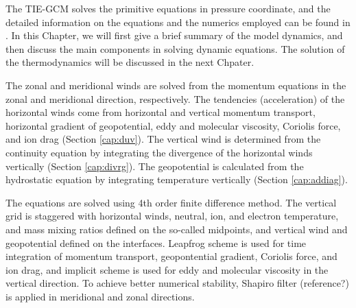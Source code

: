 The TIE-GCM solves the primitive equations in pressure coordinate, and the detailed information on
the equations and the numerics employed can be found in \cite{dickinsonetal81}. In this Chapter,
we will first give a brief summary of the model dynamics, and then discuss the main components
in solving dynamic equations. The solution of the thermodynamics will be discussed in the next
Chpater.

The zonal and meridional winds are solved from the momentum equations in the zonal and meridional
direction, respectively. The tendencies (acceleration) of the horizontal winds come from horizontal
and vertical momentum transport, horizontal gradient of geopotential, eddy and molecular viscosity,
Coriolis force, and ion drag (Section \ref{cap:duv}). The vertical wind is determined from the
continuity equation by integrating the divergence of the horizontal winds vertically (Section
\ref{cap:divrg}). The geopotential is calculated from the hydrostatic equation by integrating
temperature vertically (Section \ref{cap:addiag}).

The equations are solved using 4th order finite difference method. The vertical grid is staggered
with horizontal winds, neutral, ion, and electron temperature, and mass mixing ratios defined
on the so-called midpoints, and vertical wind and geopotential defined on the interfaces.
Leapfrog scheme is used for time integration of momentum transport, geopontential gradient,
Coriolis force, and ion drag, and implicit scheme is used for eddy and molecular viscosity
in the vertical direction. To achieve better numerical stability, Shapiro filter (reference?) is
applied in meridional and zonal directions.
